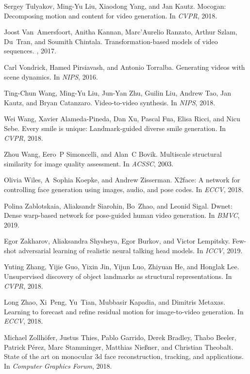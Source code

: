 \documentclass{article}
\begin{document}
\begin{thebibliography}{10}
	Sergey Tulyakov, Ming-Yu Liu, Xiaodong Yang, and Jan Kautz.
	\newblock Mocogan: Decomposing motion and content for video generation.
	\newblock In {\em CVPR}, 2018.
	
	Joost Van~Amersfoort, Anitha Kannan, Marc'Aurelio Ranzato, Arthur Szlam,
	Du~Tran, and Soumith Chintala.
	\newblock Transformation-based models of video sequences.
	, 2017.
	
	Carl Vondrick, Hamed Pirsiavash, and Antonio Torralba.
	\newblock Generating videos with scene dynamics.
	\newblock In {\em NIPS}, 2016.
	
	Ting-Chun Wang, Ming-Yu Liu, Jun-Yan Zhu, Guilin Liu, Andrew Tao, Jan Kautz,
	and Bryan Catanzaro.
	\newblock Video-to-video synthesis.
	\newblock In {\em NIPS}, 2018.
	
	Wei Wang, Xavier Alameda-Pineda, Dan Xu, Pascal Fua, Elisa Ricci, and Nicu
	Sebe.
	\newblock Every smile is unique: Landmark-guided diverse smile generation.
	\newblock In {\em CVPR}, 2018.
	
	Zhou Wang, Eero~P Simoncelli, and Alan~C Bovik.
	\newblock Multiscale structural similarity for image quality assessment.
	\newblock In {\em ACSSC}, 2003.
	
	Olivia Wiles, A~Sophia Koepke, and Andrew Zisserman.
	\newblock X2face: A network for controlling face generation using images,
	audio, and pose codes.
	\newblock In {\em ECCV}, 2018.
	
	Polina Zablotskaia, Aliaksandr Siarohin, Bo~Zhao, and Leonid Sigal.
	\newblock Dwnet: Dense warp-based network for pose-guided human video
	generation.
	\newblock In {\em BMVC}, 2019.
	
	Egor Zakharov, Aliaksandra Shysheya, Egor Burkov, and Victor Lempitsky.
	\newblock Few-shot adversarial learning of realistic neural talking head
	models.
	\newblock In {\em ICCV}, 2019.
	
	Yuting Zhang, Yijie Guo, Yixin Jin, Yijun Luo, Zhiyuan He, and Honglak Lee.
	\newblock Unsupervised discovery of object landmarks as structural
	representations.
	\newblock In {\em CVPR}, 2018.
	
	Long Zhao, Xi~Peng, Yu~Tian, Mubbasir Kapadia, and Dimitris Metaxas.
	\newblock Learning to forecast and refine residual motion for image-to-video
	generation.
	\newblock In {\em ECCV}, 2018.
	
	Michael Zollh{\"o}fer, Justus Thies, Pablo Garrido, Derek Bradley, Thabo
	Beeler, Patrick P{\'e}rez, Marc Stamminger, Matthias Nie{\ss}ner, and
	Christian Theobalt.
	\newblock State of the art on monocular 3d face reconstruction, tracking, and
	applications.
	\newblock In {\em Computer Graphics Forum}, 2018.
	
\end{thebibliography}
\clearpage
\renewcommand{\thesection}{\Alph{section}}
\setcounter{section}{0}
\end{document}
